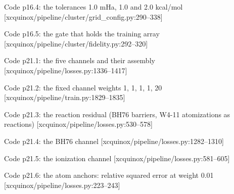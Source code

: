 \begin{frame}[allowframebreaks]{Code p16.4: the tolerances 1.0 mHa, 1.0 and 2.0 kcal/mol [xcquinox/pipeline/cluster/grid\_config.py:290--338]}
\label{code:p16_4_the_tolerances_1_0_mha_1_0_and_2_0_kcal}
\end{frame}
\begin{frame}[allowframebreaks]{Code p16.5: the gate that holds the training array [xcquinox/pipeline/cluster/fidelity.py:292--320]}
\label{code:p16_5_the_gate_that_holds_the_training_array}
\end{frame}
\begin{frame}[allowframebreaks]{Code p21.1: the five channels and their assembly [xcquinox/pipeline/losses.py:1336--1417]}
\label{code:p21_1_the_five_channels_and_their_assembly}
\end{frame}
\begin{frame}[allowframebreaks]{Code p21.2: the fixed channel weights 1, 1, 1, 1, 20 [xcquinox/pipeline/train.py:1829--1835]}
\label{code:p21_2_the_fixed_channel_weights_1_1_1_1_20}
\end{frame}
\begin{frame}[allowframebreaks]{Code p21.3: the reaction residual (BH76 barriers, W4-11 atomizations as reactions) [xcquinox/pipeline/losses.py:530--578]}
\label{code:p21_3_the_reaction_residual_bh76_barriers_w4_1}
\end{frame}
\begin{frame}[allowframebreaks]{Code p21.4: the BH76 channel [xcquinox/pipeline/losses.py:1282--1310]}
\label{code:p21_4_the_bh76_channel}
\end{frame}
\begin{frame}[allowframebreaks]{Code p21.5: the ionization channel [xcquinox/pipeline/losses.py:581--605]}
\label{code:p21_5_the_ionization_channel}
\end{frame}
\begin{frame}[allowframebreaks]{Code p21.6: the atom anchors: relative squared error at weight 0.01 [xcquinox/pipeline/losses.py:223--243]}
\label{code:p21_6_the_atom_anchors_relative_squared_error}
\end{frame}
